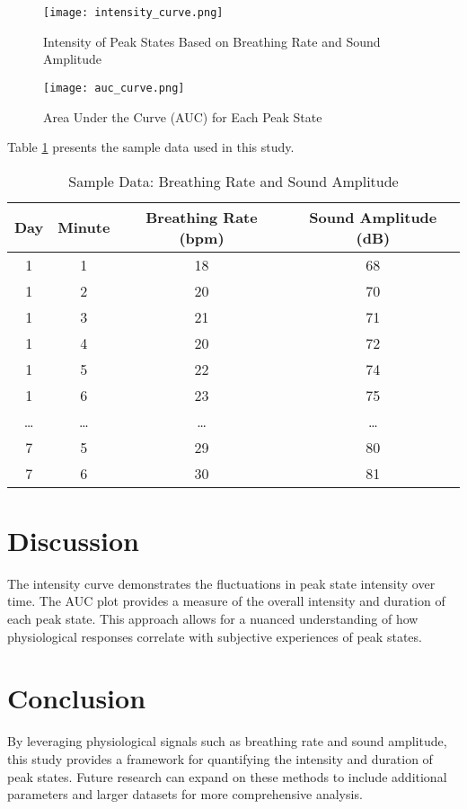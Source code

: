 \documentclass{article}
\begin{document}
\begin{figure}[h]
    \centering
    \texttt{[image: intensity\_curve.png]}
    \caption{Intensity of Peak States Based on Breathing Rate and Sound Amplitude}
    \label{fig:intensity_curve}
\end{figure}

\begin{figure}[h]
    \centering
    \texttt{[image: auc\_curve.png]}
    \caption{Area Under the Curve (AUC) for Each Peak State}
    \label{fig:auc_curve}
\end{figure}

Table \ref{tab:sample_data} presents the sample data used in this study.

\begin{table}[h]
    \centering
    \caption{Sample Data: Breathing Rate and Sound Amplitude}
    \label{tab:sample_data}
    \begin{tabular}{@{}cccc@{}}
        \toprule
        Day & Minute & Breathing Rate (bpm) & Sound Amplitude (dB) \\ \midrule
        1 & 1 & 18 & 68 \\
        1 & 2 & 20 & 70 \\
        1 & 3 & 21 & 71 \\
        1 & 4 & 20 & 72 \\
        1 & 5 & 22 & 74 \\
        1 & 6 & 23 & 75 \\
        \dots & \dots & \dots & \dots \\
        7 & 5 & 29 & 80 \\
        7 & 6 & 30 & 81 \\
        \bottomrule
    \end{tabular}
\end{table}

\section{Discussion}
The intensity curve demonstrates the fluctuations in peak state intensity over time. The AUC plot provides a measure of the overall intensity and duration of each peak state. This approach allows for a nuanced understanding of how physiological responses correlate with subjective experiences of peak states.

\section{Conclusion}
By leveraging physiological signals such as breathing rate and sound amplitude, this study provides a framework for quantifying the intensity and duration of peak states. Future research can expand on these methods to include additional parameters and larger datasets for more comprehensive analysis.
\end{document}
